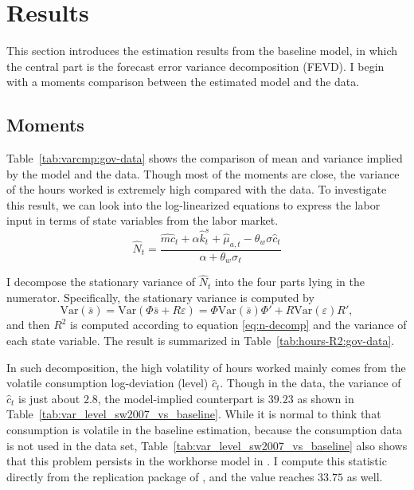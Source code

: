 \section{Results}
\label{sec:results}
This section introduces the estimation results from the baseline model, in which the central part is the forecast error variance decomposition (FEVD). I begin with a moments comparison between the estimated model and the data.

\subsection{Moments}
\label{sec:results:moments}
Table~\ref{tab:varcmp:gov-data} shows the comparison of mean and variance implied by the model and the data. Though most of the moments are close, the variance of the hours worked is extremely high compared with the data. To investigate this result, we can look into the log-linearized equations to express the labor input in terms of state variables from the labor market.
\begin{equation}\label{eq:n-decomp}
    \hat N_t = \frac{\hat{mc}_t + \alpha \hat{k}^s_t + \hat{\mu}_{a,t} - \theta_w \sigma \hat{c}_t}{\alpha + \theta_w \sigma_\ell}
\end{equation}



I decompose the stationary variance of $\hat N_t$ into the four parts lying in the numerator. Specifically, the stationary variance is computed by
$$ \mathrm{Var}(\bar s) = \mathrm{Var}(\Phi \bar s + R \varepsilon) = \Phi \mathrm{Var}(\bar s) \Phi' + R \mathrm{Var}(\varepsilon) R',$$
and then $R^2$ is computed according to equation \eqref{eq:n-decomp} and the variance of each state variable. The result is summarized in Table~\ref{tab:hours-R2:gov-data}. 



In such decomposition, the high volatility of hours worked mainly comes from the volatile consumption log-deviation (level) $\hat c_t$. Though in the data, the variance of $\hat c_t$ is just about $2.8$, the model-implied counterpart is $39.23$ as shown in Table~\ref{tab:var_level_sw2007_vs_baseline}. While it is normal to think that consumption is volatile in the baseline estimation, because the consumption data is not used in the data set, Table~\ref{tab:var_level_sw2007_vs_baseline} also shows that this problem persists in the workhorse model in \cite{smetsShocksFrictionsUS2007}. I compute this statistic directly from the replication package of \cite{smetsShocksFrictionsUS2007}, and the value reaches $33.75$ as well.

